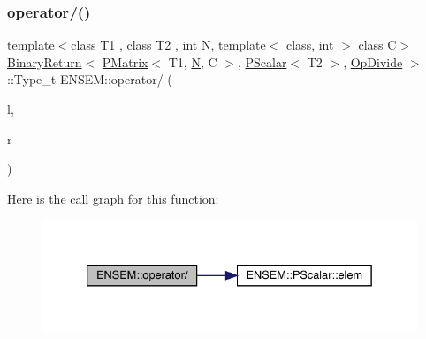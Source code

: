 \subsubsection{\texorpdfstring{operator/()}{operator/()}}
{\footnotesize\ttfamily template$<$class T1 , class T2 , int N, template$<$ class, int $>$ class C$>$ \\
\mbox{\hyperlink{structENSEM_1_1BinaryReturn}{Binary\+Return}}$<$ \mbox{\hyperlink{classENSEM_1_1PMatrix}{P\+Matrix}}$<$ T1, \mbox{\hyperlink{operator__name__util_8cc_a7722c8ecbb62d99aee7ce68b1752f337}{N}}, C $>$, \mbox{\hyperlink{classENSEM_1_1PScalar}{P\+Scalar}}$<$ T2 $>$, \mbox{\hyperlink{structENSEM_1_1OpDivide}{Op\+Divide}} $>$\+::Type\+\_\+t E\+N\+S\+E\+M\+::operator/ (\begin{DoxyParamCaption}\item[{const \mbox{\hyperlink{classENSEM_1_1PMatrix}{P\+Matrix}}$<$ T1, \mbox{\hyperlink{operator__name__util_8cc_a7722c8ecbb62d99aee7ce68b1752f337}{N}}, C $>$ \&}]{l,  }\item[{const \mbox{\hyperlink{classENSEM_1_1PScalar}{P\+Scalar}}$<$ T2 $>$ \&}]{r }\end{DoxyParamCaption})\hspace{0.3cm}{\ttfamily [inline]}}

Here is the call graph for this function\+:\nopagebreak
\begin{figure}[H]
\begin{center}
\leavevmode
\includegraphics[width=333pt]{df/d0a/group__primmatrix_ga1b00e76a765453dfbb33f0630bd863c3_cgraph}
\end{center}
\end{figure}
\mbox{\label{group__primmatrix_gafa0f739db2eca6b8b80d632ce81f78b7}} 
